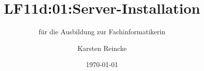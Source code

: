 \documentclass[]{beamer}
\title{LF11d:01:Server-Installation}
\subtitle{für die Ausbildung zur Fachinformatikerin}
\institute[GS-LDK]{Gewerbliche Schulen Dillenburg}
\author{Karsten Reincke}
\date{\today}
\def\cfgGl{../../../cfg.gl/}
\begin{document}

\begin{frame}
  \titlepage

  
\end{frame}






\logo{}
\newpage



%
\end{document}
